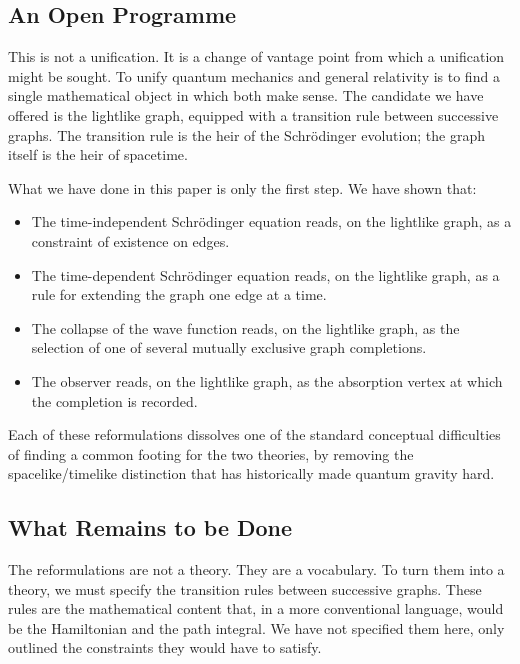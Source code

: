 \documentclass[11pt]{article}
\begin{document}
\subsection{An Open Programme}

This is not a unification. It is a change of vantage point from which a unification might be sought. To unify quantum mechanics and general relativity is to find a single mathematical object in which both make sense. The candidate we have offered is the lightlike graph, equipped with a transition rule between successive graphs. The transition rule is the heir of the Schr\"odinger evolution; the graph itself is the heir of spacetime.

What we have done in this paper is only the first step. We have shown that:
\begin{itemize}
    \item The time-independent Schr\"odinger equation reads, on the lightlike graph, as a constraint of existence on edges.
    \item The time-dependent Schr\"odinger equation reads, on the lightlike graph, as a rule for extending the graph one edge at a time.
    \item The collapse of the wave function reads, on the lightlike graph, as the selection of one of several mutually exclusive graph completions.
    \item The observer reads, on the lightlike graph, as the absorption vertex at which the completion is recorded.
\end{itemize}
Each of these reformulations dissolves one of the standard conceptual difficulties of finding a common footing for the two theories, by removing the spacelike/timelike distinction that has historically made quantum gravity hard.

\subsection{What Remains to be Done}

The reformulations are not a theory. They are a vocabulary. To turn them into a theory, we must specify the transition rules between successive graphs. These rules are the mathematical content that, in a more conventional language, would be the Hamiltonian and the path integral. We have not specified them here, only outlined the constraints they would have to satisfy.
\end{document}
